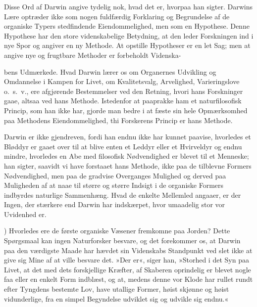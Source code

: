 \documentclass[12pt,a4paper]{article}
\begin{document}
Disse Ord af Darwin angive tydelig nok, hvad det er, hvorpaa han
sigter. Darwins Lære optræder ikke som nogen fuldfærdig Forklaring og
Begrundelse af de organiske Typers stedfindende Eiendommelighed, men
som en Hypothese. Denne Hypothese har den store videnskabelige
Betydning, at den leder Forskningen ind i nye Spor og angiver en ny
Methode. At opstille Hypotheser er en let Sag; men at angive nye og
frugtbare Methoder er forbeholdt Videnska-


bens Udmærkede. Hvad Darwin lærer os om Organernes Udvikling og
Omdannelse i Kampen for Livet, om Kvalitetsvalg, Arvelighed,
Varieringslove o.\ s.\ v., ere afgjørende Bestemmelser ved den
Retning, hvori hans Forskninger gaae, altsaa ved hans Methode.
Istedenfor at paaprakke ham et naturfilosofisk Princip, som han ikke
har, gjorde man bedre i at fæste sin hele Opmærksomhed paa Methodens
Eiendommelighed, thi Forskerens Princip er hans Methode.

Darwin er ikke gjendreven, fordi han endnu ikke har kunnet paavise,
hvorledes et Bløddyr er gaaet over til at blive enten et Leddyr eller
et Hvirveldyr og endnu mindre, hvorledes en Abe med filosofisk
Nødvendighed er blevet til et Menneske; han sigter, saavidt vi have
forstaaet hans Methode, ikke paa de tilblevne Formers Nødvendighed,
men paa de gradvise Overganges Mulighed og derved paa Muligheden af at
naae til større og større Indsigt i de organiske Formers indbyrdes
naturlige Sammenhæng. Hvad de enkelte Mellemled angaaer, er der Ingen,
der stærkere end Darwin har indskærpet, hvor umaadelig stor vor
Uvidenhed er.


\medskip

) Hvorledes ere de første organiske Væsener fremkomne paa
Jorden? Dette Spørgsmaal kan ingen Naturforsker besvare, og det
forekommer os, at Darwin paa den værdigste Maade har hævdet sin
Videnskabs Standpunkt ved slet ikke at give sig Mine af at ville
besvare det. »Der er«, siger han, »Storhed i det Syn paa Livet, at
det med dets forskjellige Kræfter, af Skaberen oprindelig er blevet
nogle faa eller en enkelt Form indblæst, og at, medens denne vor Klode
har rullet rundt efter Tyngdens bestemte Lov, have utallige Former,
høist skjønne og høist vidunderlige, fra en simpel Begyndelse udviklet
sig og udvikle sig endnu.«
\end{document}

